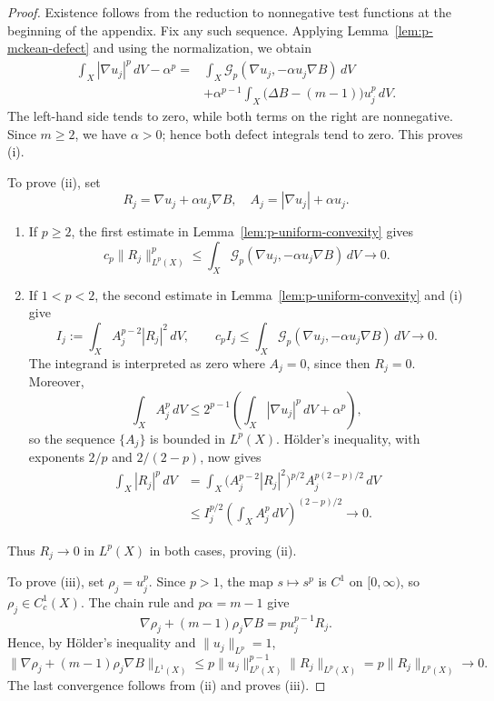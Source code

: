 \documentclass[12pt]{amsart}
\theoremstyle{definition}
\numberwithin{equation}{section}
\newcommand{\mc}{\mathcal}
\begin{document}
\begin{proof}
Existence follows from the reduction to nonnegative test functions at
the beginning of the appendix.  Fix any such sequence.  Applying
Lemma~\ref{lem:p-mckean-defect} and using the normalization, we obtain
\[
\begin{aligned}
  \int_X|\nabla u_j|^p\,dV-\alpha^p
  ={}&\int_X\mc G_p(\nabla u_j,-\alpha u_j\nabla B)\,dV\\
     &+\alpha^{p-1}\int_X
       \bigl(\Delta B-(m-1)\bigr)u_j^p\,dV.
\end{aligned}
\]
The left-hand side tends to zero, while both terms on the right are
nonnegative.  Since \(m\geq2\), we have \(\alpha>0\); hence both defect
integrals tend to zero.  This proves \textup{(i)}.

To prove \textup{(ii)}, set
\[
  R_j=\nabla u_j+\alpha u_j\nabla B,
  \quad
  A_j=|\nabla u_j|+\alpha u_j.
\]
\begin{enumerate}[label=\textup{(\arabic*)}]
\item If \(p\geq2\), the first estimate in
Lemma~\ref{lem:p-uniform-convexity} gives
\[
  c_p\|R_j\|_{L^p(X)}^p
  \leq
  \int_X\mc G_p(\nabla u_j,-\alpha u_j\nabla B)\,dV
  \longrightarrow0.
\]

\item If \(1<p<2\), the second estimate in
Lemma~\ref{lem:p-uniform-convexity} and \textup{(i)} give
\[
  I_j:=\int_XA_j^{p-2}|R_j|^2\,dV,
  \qquad
  c_pI_j
  \leq\int_X\mc G_p(\nabla u_j,-\alpha u_j\nabla B)\,dV
  \longrightarrow0.
\]
The integrand is interpreted as zero where \(A_j=0\), since then
\(R_j=0\).  Moreover,
\[
  \int_XA_j^p\,dV
  \leq 2^{p-1}
    \left(\int_X|\nabla u_j|^p\,dV+\alpha^p\right),
\]
so the sequence \(\{A_j\}\) is bounded in \(L^p(X)\).  H\"older's
inequality, with exponents \(2/p\) and \(2/(2-p)\), now gives
\[
\begin{aligned}
  \int_X|R_j|^p\,dV
  &=\int_X
    \bigl(A_j^{p-2}|R_j|^2\bigr)^{p/2}
    A_j^{p(2-p)/2}\,dV\\
  &\leq I_j^{p/2}
    \left(\int_XA_j^p\,dV\right)^{(2-p)/2}
  \longrightarrow0.
\end{aligned}
\]
\end{enumerate}
Thus \(R_j\to0\) in \(L^p(X)\) in both cases, proving \textup{(ii)}.

To prove \textup{(iii)}, set \(\rho_j=u_j^p\).  Since \(p>1\), the map
\(s\mapsto s^p\) is \(C^1\) on \([0,\infty)\), so
\(\rho_j\in C_c^1(X)\).  The chain rule and \(p\alpha=m-1\) give
\[
  \nabla\rho_j+(m-1)\rho_j\nabla B
  =pu_j^{p-1}R_j.
\]
Hence, by H\"older's inequality and \(\|u_j\|_{L^p}=1\),
\[
  \|\nabla\rho_j+(m-1)\rho_j\nabla B\|_{L^1(X)}
  \leq p\|u_j\|_{L^p(X)}^{p-1}\|R_j\|_{L^p(X)}
  =p\|R_j\|_{L^p(X)}
  \longrightarrow0.
\]
The last convergence follows from \textup{(ii)} and proves
\textup{(iii)}.
\end{proof}
\end{document}
